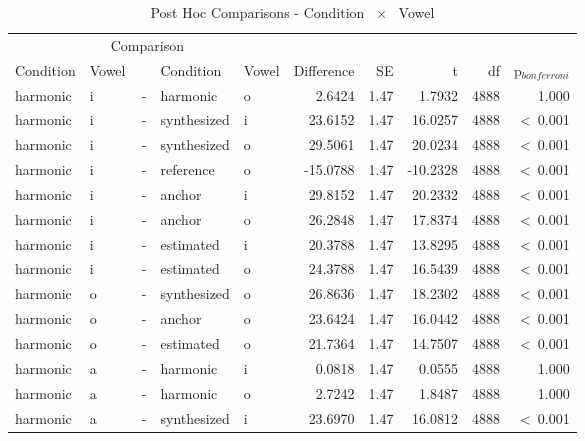 \documentclass[a4paper,man,hidelinks,floatsintext]{apa7}
\begin{document}
    
\begin{table}[!htbp]
\caption{Post Hoc Comparisons - Condition ~$\times$~ Vowel}
\label{tab:Table_9}
\begin{adjustbox}{max size={\columnwidth}{\textheight}}
\centering
\begin{tabular}{llrllrrrrr}
\hline
\multicolumn{5}{c}{Comparison} & \multicolumn{5}{c}{~} \\
\cline{1-5}
Condition   & Vowel & ~ & Condition   & Vowel & Difference &   SE &        t &   df & p$_{bonferroni}$ \\
\hline
harmonic    & i     & - & harmonic    & o     &     2.6424 & 1.47 &   1.7932 & 4888 &            1.000 \\
harmonic    & i     & - & synthesized & i     &    23.6152 & 1.47 &  16.0257 & 4888 &  \textless~0.001 \\
harmonic    & i     & - & synthesized & o     &    29.5061 & 1.47 &  20.0234 & 4888 &  \textless~0.001 \\
harmonic    & i     & - & reference   & o     &   -15.0788 & 1.47 & -10.2328 & 4888 &  \textless~0.001 \\
harmonic    & i     & - & anchor      & i     &    29.8152 & 1.47 &  20.2332 & 4888 &  \textless~0.001 \\
harmonic    & i     & - & anchor      & o     &    26.2848 & 1.47 &  17.8374 & 4888 &  \textless~0.001 \\
harmonic    & i     & - & estimated   & i     &    20.3788 & 1.47 &  13.8295 & 4888 &  \textless~0.001 \\
harmonic    & i     & - & estimated   & o     &    24.3788 & 1.47 &  16.5439 & 4888 &  \textless~0.001 \\
harmonic    & o     & - & synthesized & o     &    26.8636 & 1.47 &  18.2302 & 4888 &  \textless~0.001 \\
harmonic    & o     & - & anchor      & o     &    23.6424 & 1.47 &  16.0442 & 4888 &  \textless~0.001 \\
harmonic    & o     & - & estimated   & o     &    21.7364 & 1.47 &  14.7507 & 4888 &  \textless~0.001 \\
harmonic    & a     & - & harmonic    & i     &     0.0818 & 1.47 &   0.0555 & 4888 &            1.000 \\
harmonic    & a     & - & harmonic    & o     &     2.7242 & 1.47 &   1.8487 & 4888 &            1.000 \\
harmonic    & a     & - & synthesized & i     &    23.6970 & 1.47 &  16.0812 & 4888 &  \textless~0.001 \\

\end{tabular}
\end{adjustbox}
\end{table}
\end{document}
